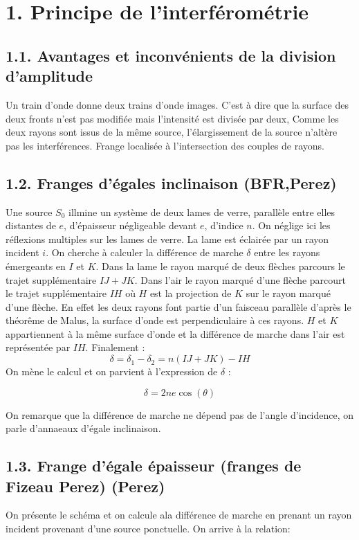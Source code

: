 \documentclass[french, a4paper, 10pt, twocolumn, landscape]{article}
\begin{document}
\section*{1. Principe de l'interférométrie}

\subsection*{1.1. Avantages et  inconvénients de la division d'amplitude}
Un train d'onde donne deux trains d'onde images. C'est à dire que la surface des deux fronts n'est pas modifiée mais l'intensité est divisée par deux, Comme les deux rayons sont issus de la même source, l'élargissement de la source n'altère pas les interférences. Frange localisée à l'intersection des couples de rayons.

\subsection*{1.2. Franges d'égales inclinaison (BFR,Perez)}
Une source $S_0$ illmine un système de deux lames de verre, parallèle entre elles distantes de $e$, d'épaisseur négligeable devant $e$, d'indice $n$. On néglige ici les réflexions multiples sur les lames de verre. 
La lame est éclairée par un rayon incident $i$. On cherche à calculer la différence de marche $\delta$ entre les rayons émergeants en $I$ et $K$. Dans la lame le rayon marqué de deux flèches parcours le trajet supplémentaire $IJ+JK$. Dans l'air le rayon marqué d'une flèche parcourt le trajet supplémentaire $IH$ où $H$ est la projection de $K$ sur le rayon marqué d'une flèche. En effet les deux rayons font partie d'un faisceau parallèle d'après le théorême de Malus, la surface d'onde est perpendiculaire à ces rayons. $H$ et $K$ appartiennent à la même surface d'onde et la différence de marche dans l'air est représentée par $IH$. Finalement : \[\delta = \delta_1-\delta_2=n(IJ+JK)-IH\]
 On mène le calcul et on parvient à l'expression de $\delta$ : 

 \begin{equation}
	\delta = 2ne\cos(\theta)
 \end{equation}

On remarque que la différence de marche ne dépend pas de l'angle d'incidence, on parle d'annaeaux d'égale inclinaison. 

\subsection*{1.3. Frange d'égale épaisseur (franges de Fizeau Perez) (Perez)}
On présente le schéma et on calcule ala différence de marche en prenant un rayon incident provenant d'une source ponctuelle. On arrive à la relation:
\end{document}
